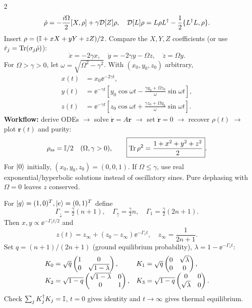 \begin{multicols}{2}\small
{}
\[\dot\rho=-\frac{i\Omega}{2}[X,\rho]+\gamma\mathcal D[Z]\rho,\quad
\mathcal D[L]\rho=L\rho L^\dagger-\frac12\{L^\dagger L,\rho\}.\]
Insert $\rho=(\mathbb I+xX+yY+zZ)/2$. Compare the $X,Y,Z$ coefficients (or use $\dot r_j=\operatorname{Tr}(\sigma_j\dot\rho)$):
\[\boxed{\dot x=-2\gamma x,\quad\dot y=-2\gamma y-\Omega z,\quad\dot z=\Omega y}.\]
For $\Omega>\gamma>0$, let $\omega=\sqrt{\Omega^2-\gamma^2}$. With $(x_0,y_0,z_0)$ arbitrary,
\[\begin{aligned}
 x(t)&=x_0\ee^{-2\gamma t},\\[-1mm]
 y(t)&=\ee^{-\gamma t}\!\left[y_0\cos\omega t-\frac{\gamma y_0+\Omega z_0}{\omega}\sin\omega t\right],\\[-1mm]
 z(t)&=\ee^{-\gamma t}\!\left[z_0\cos\omega t+\frac{\gamma z_0+\Omega y_0}{\omega}\sin\omega t\right].
\end{aligned}\]
\textbf{Workflow:} derive ODEs $\to$ solve $\dot{\bm r}=A\bm r$ $\to$ set $\dot{\bm r}=0$ $\to$ recover $\rho(t)$ $\to$ plot $\bm r(t)$ and purity:
\[\rho_{\rm ss}=\mathbb I/2\quad(\Omega,\gamma>0),\qquad\boxed{\operatorname{Tr}\rho^2=\frac{1+x^2+y^2+z^2}{2}}.\]
For $\left\lvert 0\right\rangle$ initially, $(x_0,y_0,z_0)=(0,0,1)$. If $\Omega\le\gamma$, use real exponential/hyperbolic solutions instead of oscillatory sines. Pure dephasing with $\Omega=0$ leaves $z$ conserved.

For $\left\lvert g\right\rangle=(1,0)^T,\left\lvert e\right\rangle=(0,1)^T$ define
\[\Gamma_\downarrow=\tfrac\gamma2(n+1),\quad \Gamma_\uparrow=\tfrac\gamma2 n,\quad \Gamma_1=\tfrac\gamma2(2n+1).\]
Then $x,y\propto \ee^{-\Gamma_1t/2}$ and
\[\boxed{z(t)=z_\infty+(z_0-z_\infty)\ee^{-\Gamma_1t},\quad z_\infty=\frac1{2n+1}}.\]
Set $q=(n+1)/(2n+1)$ (ground equilibrium probability), $\lambda=1-\ee^{-\Gamma_1t}$:
\[\begin{array}{@{}ll@{}}
K_0=\sqrt q\begin{pmatrix}1&0\\0&\sqrt{1-\lambda}\end{pmatrix},&
K_1=\sqrt q\begin{pmatrix}0&\sqrt\lambda\\0&0\end{pmatrix},\\[2mm]
K_2=\sqrt{1-q}\begin{pmatrix}\sqrt{1-\lambda}&0\\0&1\end{pmatrix},&
K_3=\sqrt{1-q}\begin{pmatrix}0&0\\\sqrt\lambda&0\end{pmatrix}.
\end{array}\]
Check $\sum_jK_j^\dagger K_j=\mathbb I$, $t=0$ gives identity and $t\to\infty$ gives thermal equilibrium.


\end{multicols}
